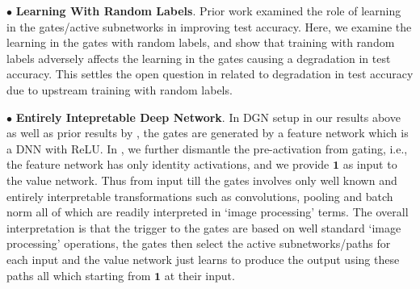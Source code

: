 \documentclass{article} %
\begin{document}
$\bullet$ \textbf{Learning With Random Labels}. Prior work examined the role of learning in the gates/active subnetworks in improving test accuracy. Here, we examine the learning in the gates with random labels, and  show that  training with random labels adversely affects the learning in the gates causing a degradation in test accuracy. This settles the open question in  related to degradation in test accuracy due to upstream training with random labels.

$\bullet$ \textbf{Entirely Intepretable Deep Network}. In DGN setup in our results above as well as prior results by \cite{npk}, the gates are generated by a feature network which is a DNN with ReLU. In , we further dismantle the pre-activation from gating, i.e., the feature network has only identity activations, and we provide $\mathbf{1}$ as input to the value network. Thus from input till the gates involves only well known and entirely interpretable transformations such as convolutions, pooling and batch norm all of which are readily interpreted in `image processing' terms. The overall interpretation is that the trigger to the gates are based on well standard `image processing' operations, the gates then select the active subnetworks/paths for each input and the value network just learns to produce the output using these paths all which starting from $\mathbf{1}$ at their input.






\end{document}
